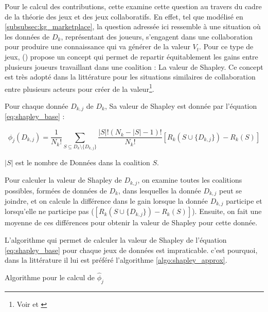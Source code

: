 Pour le calcul des contributions, cette examine cette question au travers du cadre de la théorie des jeux et des jeux collaboratifs. En effet, tel que modélisé en \ref{subsubsec:kg_marketplace}, la question adressée ici ressemble à une situation où les données de $D_k$, représentant des joueurs, s'engagent dans une collaboration pour produire une connaissance qui va générer de la valeur $V_t$. Pour ce type de jeux, \citeauthor{l_s_shapley_value_1952} (\citeyear{l_s_shapley_value_1952}) propose un concept qui permet de repartir équitablement les gains entre plusieurs joueurs travaillant dans une coalition :  La valeur de Shapley. Ce concept est très adopté dans la littérature pour les situations similaires de collaboration entre plusieurs acteurs pour créer de la valeur\footnote{Voir \cite{agarwal_marketplace_2019} et \cite{khan_incentive_2023}}. 

Pour chaque donnée $D_{k,j}$ de $D_k$, Sa valeur de Shapley est donnée par l'équation \ref{eq:shapley_base} :

\begin{equation} \label{eq:shapley_base}
    \phi_j(D_{k,j}) = \frac{1}{N_k!} \sum_{S \subseteq D_k \setminus \{D_{k,j}\}} \frac{|S|!(N_k-|S|-1)!}{N_k!} \left[ R_k(S \cup \{D_{k,j}\}) - R_k(S) \right] 
\end{equation}

$\left|S\right|$ est le nombre de Données dans la coalition $S$.

Pour calculer la valeur de Shapley de $D_{k,j}$, on examine toutes les coalitions possibles, formées de données de $D_k$, dans lesquelles la donnée $D_{k,j}$ peut se joindre, et on calcule la différence dans le gain lorsque la donnée $D_{k,j}$ participe et lorsqu'elle ne participe pas ($\left[ R_k(S \cup \{D_{k,j}\}) - R_k(S) \right]$). Ensuite, on fait une moyenne de ces différences pour obtenir la valeur de Shapley pour cette donnée.

L'algorithme qui permet de calculer la valeur de Shapley de l'équation \ref{eq:shapley_base} pour chaque jeux de données est impraticable. c'est pourquoi, dans la littérature il lui est préféré l'algorithme \autoref{algo:shapley_approx}.

\begin{algorithm} \label{algo:shapley_approx}
\caption{Algorithme pour le calcul de $\hat{\phi}_j$}

\end{algorithm}

